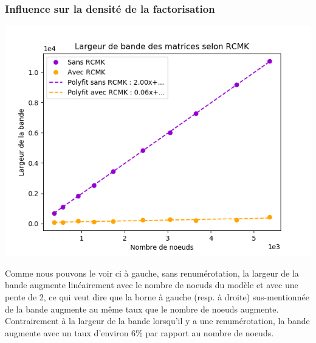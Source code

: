 \documentclass{article}[11pt]
\begin{document}
\subsubsection{Influence sur la densité de la factorisation}
\label{sub:band}
\begin{minipage}{0.5\textwidth}
    \includegraphics[width=\textwidth]{res/plots/bandRCMK.png}
\end{minipage}
\begin{minipage}{0.5\textwidth}
    Comme nous pouvons le voir ci à gauche, sans renumérotation, la largeur de la bande augmente linéairement avec le nombre de noeuds du modèle et avec une pente de 2, ce qui veut dire que la borne à gauche (resp. à droite) sus-mentionnée de la bande augmente au même taux que le nombre de noeuds augmente. Contrairement à la largeur de la bande lorsqu'il y a une renumérotation, la bande augmente avec un taux d'environ 6\% par rapport au nombre de noeuds.
\end{minipage}
\end{document}

